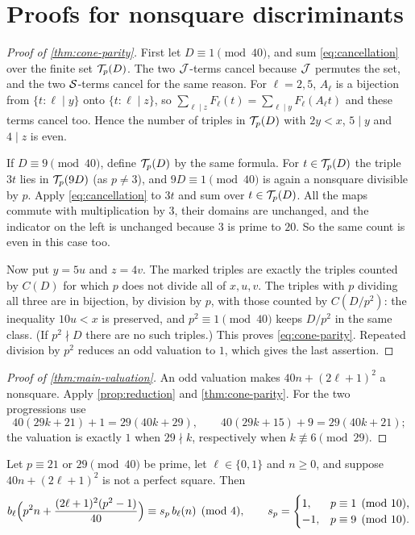 \section{Proofs for nonsquare discriminants}\label{sec:nonsquare}

\begin{proof}[Proof of \cref{thm:cone-parity}]
First let $D\equiv1\pmod{40}$, and sum \eqref{eq:cancellation} over the finite
set $\mathcal T_p(D)$. The two $\mathcal J$-terms cancel because $\mathcal J$ permutes the set, and
the two $\mathcal S$-terms cancel for the same reason. For $\ell=2,5$, $A_\ell$ is a
bijection from $\{t:\ell\mid y\}$ onto $\{t:\ell\mid z\}$, so
$\sum_{\ell\mid z}F_\ell(t)=\sum_{\ell\mid y}F_\ell(A_\ell t)$ and these terms cancel too.
Hence the number of triples in $\mathcal T_p(D)$ with $2y<x$, $5\mid y$ and $4\mid z$ is
even.

If $D\equiv9\pmod{40}$, define $\mathcal T_p(D)$ by the same formula. For
$t\in\mathcal T_p(D)$ the triple $3t$ lies in $\mathcal T_p(9D)$ (as $p\ne3$), and
$9D\equiv1\pmod{40}$ is again a nonsquare divisible by $p$. Apply
\eqref{eq:cancellation} to $3t$ and sum over $t\in\mathcal T_p(D)$. All the maps
commute with multiplication by $3$, their domains are unchanged, and the
indicator on the left is unchanged because $3$ is prime to $20$. So the same
count is even in this case too.

Now put $y=5u$ and $z=4v$. The marked triples are exactly the triples counted by
$C(D)$ for which $p$ does not divide all of $x,u,v$. The triples with $p$
dividing all three are in bijection, by division by $p$, with those counted by
$C(D/p^2)$: the inequality $10u<x$ is preserved, and $p^2\equiv1\pmod{40}$ keeps
$D/p^2$ in the same class. (If $p^2\nmid D$ there are no such triples.) This
proves \eqref{eq:cone-parity}. Repeated division by $p^2$ reduces an odd
valuation to $1$, which gives the last assertion.
\end{proof}

\begin{proof}[Proof of \cref{thm:main-valuation}]
An odd valuation makes $40n+(2\ell+1)^2$ a nonsquare. Apply
\cref{prop:reduction} and \cref{thm:cone-parity}. For the two progressions use
\[
  40(29k+21)+1=29(40k+29),\qquad 40(29k+15)+9=29(40k+21);
\]
the valuation is exactly $1$ when $29\nmid k$, respectively when
$k\not\equiv6\pmod{29}$.
\end{proof}

\begin{corollary}\label{cor:scaling-nonsquare}
Let $p\equiv21$ or $29\pmod{40}$ be prime, let $\ell\in\{0,1\}$ and $n\ge0$, and
suppose $40n+(2\ell+1)^2$ is not a perfect square. Then
\[
  b_\ell\Bigl(p^2n+\frac{(2\ell+1)^2(p^2-1)}{40}\Bigr)\equiv s_p\,b_\ell(n)\pmod4,\qquad
  s_p=\begin{cases}1,&p\equiv1\pmod{10},\\-1,&p\equiv9\pmod{10}.\end{cases}
\]
\end{corollary}

